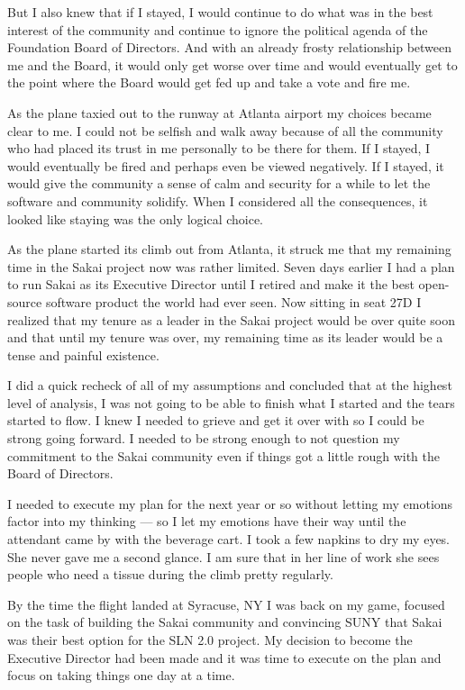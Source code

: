\documentclass[12pt]{book}
\begin{document}
But I also knew that if I stayed, I would continue to
do what was in the best interest of the community and
continue to ignore the political agenda of the Foundation
Board of Directors.  And with an already frosty relationship
between me and the Board, it would only get worse over
time and would eventually get to the point where the
Board would get fed up and take a vote and fire me.

As the plane taxied out to the runway at Atlanta airport
my choices became clear to me.   I could not be
selfish and walk away because of all the community who
had placed its trust in me personally to be there for
them.  If I stayed, I would  eventually be fired and
perhaps even be viewed negatively.
If I stayed, it would give the community a sense of calm and
security for a while to let the software and community
solidify.  When I considered all the consequences,
it looked like staying was the only logical choice.

As the plane started its climb out from Atlanta, it
struck me that my remaining time in the Sakai project
now was rather limited.  Seven days earlier I had a
plan to run Sakai as its Executive Director
until I retired
and make it the best open-source software product the
world had ever seen.
Now sitting in seat 27D I realized that my tenure as
a leader in the Sakai project would be over quite soon
and that until my tenure was over, my remaining time
as its leader would be a tense and painful existence.

I did a quick recheck of all of my assumptions and
concluded that at the highest level of analysis, I
was not going to be able to finish what I started and
the tears started to flow.  I knew I needed to grieve
and get it over with so I could be strong
going forward.  I needed to be strong enough to not
question my commitment to the Sakai community even if things
got a little rough with the Board of Directors.

I needed to execute my plan for
the next year or so without letting my emotions factor
into my thinking --- so I let my emotions have their way
until the attendant came by with the beverage cart.  I
took a few napkins to dry my eyes.  She never gave me
a second glance. I am sure that in her line of work
she sees people who need a tissue during the climb
pretty regularly.

By the time the flight landed at Syracuse, NY I was back on
my game, focused on the task of building the
Sakai community and convincing SUNY that Sakai was their
best option for the SLN 2.0 project.
My decision to become the Executive Director had been made
and it was time to execute on the plan and focus on
taking things one day at a time.
\end{document}
